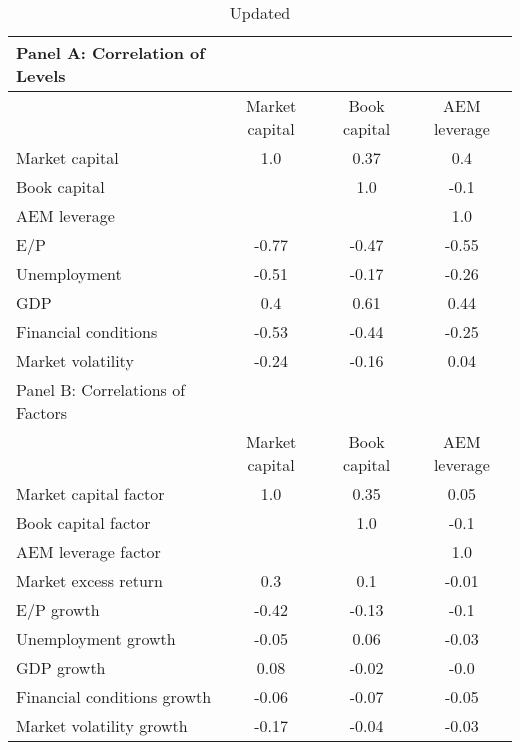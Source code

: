 
    \begin{table}[htbp]
    \centering
    \caption{\label{tab:correlation}Updated}
    \begin{adjustbox}{max width=\textwidth}
    \small
    \begin{tabular}{lccc}
        \toprule
        Panel A: Correlation of Levels \\
        \midrule
         & Market capital & Book capital & AEM leverage \\
        \midrule
        Market capital & 1.0 & 0.37 & 0.4 \\
Book capital &  & 1.0 & -0.1 \\
AEM leverage &  &  & 1.0 \\
E/P & -0.77 & -0.47 & -0.55 \\
Unemployment & -0.51 & -0.17 & -0.26 \\
GDP & 0.4 & 0.61 & 0.44 \\
Financial conditions & -0.53 & -0.44 & -0.25 \\
Market volatility & -0.24 & -0.16 & 0.04 \\
        \midrule
        Panel B: Correlations of Factors \\
        \midrule
         & Market capital & Book capital & AEM leverage \\
        \midrule
        Market capital factor & 1.0 & 0.35 & 0.05 \\
Book capital factor &  & 1.0 & -0.1 \\
AEM leverage factor &  &  & 1.0 \\
Market excess return & 0.3 & 0.1 & -0.01 \\
E/P growth & -0.42 & -0.13 & -0.1 \\
Unemployment growth & -0.05 & 0.06 & -0.03 \\
GDP growth & 0.08 & -0.02 & -0.0 \\
Financial conditions growth & -0.06 & -0.07 & -0.05 \\
Market volatility growth & -0.17 & -0.04 & -0.03 \\
        \bottomrule
    \end{tabular}
    \end{adjustbox}
    \end{table}
    